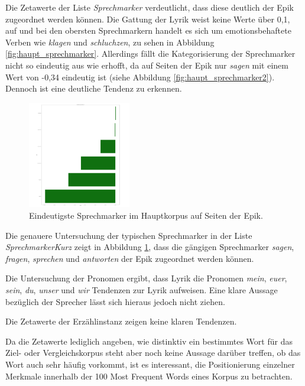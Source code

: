 \documentclass[a4paper,10p]{article}
\begin{document}
Die Zetawerte der Liste \textit{Sprechmarker} verdeutlicht, dass diese deutlich der Epik zugeordnet werden können. Die Gattung der Lyrik weist keine Werte über 0,1, auf und bei den obersten Sprechmarkern handelt es sich um emotionsbehaftete Verben wie \textit{klagen} und \textit{schluchzen}, zu sehen in Abbildung \ref{fig:haupt_sprechmarker}. Allerdings fällt die Kategorisierung der Sprechmarker nicht so eindeutig aus wie erhofft, da auf Seiten der Epik nur \textit{sagen} mit einem Wert von -0,34 eindeutig ist (siehe Abbildung \ref{fig:haupt_sprechmarker2}). Dennoch ist eine deutliche Tendenz zu erkennen. \par 

\begin{figure}
	\includegraphics[width=0.4\textwidth]{haupt_sprechmarkerKurz_pro_wort.png}
	\caption{Eindeutigste Sprechmarker im Hauptkorpus auf Seiten der Epik.}
	\label{fig:haupt_sprechmarkerKurz}
\end{figure}


Die genauere Untersuchung der typischen Sprechmarker in der Liste \textit{SprechmarkerKurz} zeigt in Abbildung \ref{fig:haupt_sprechmarkerKurz}, dass die gängigen Sprechmarker \textit{sagen}, \textit{fragen}, \textit{sprechen} und \textit{antworten} der Epik zugeordnet werden können. \par 

Die Untersuchung der Pronomen ergibt, dass Lyrik die Pronomen \textit{mein}, \textit{euer}, \textit{sein}, \textit{du}, \textit{unser} und \textit{wir} Tendenzen zur Lyrik aufweisen. Eine klare Aussage bezüglich der Sprecher lässt sich hieraus jedoch nicht ziehen. \par 

Die Zetawerte der Erzählinstanz zeigen keine klaren Tendenzen. \par

Da die Zetawerte lediglich angeben, wie distinktiv ein bestimmtes Wort für das Ziel- oder Vergleichskorpus steht aber noch keine Aussage darüber treffen, ob das Wort auch sehr häufig vorkommt, ist es interessant, die Positionierung einzelner Merkmale innerhalb der 100 Most Frequent Words eines Korpus zu betrachten.\par 
\end{document}
